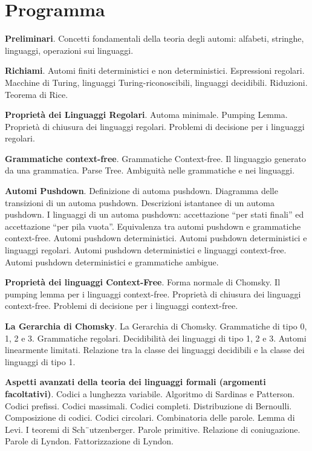 \setcounter{chapter}{-1}
\chapter{Programma}
\textbf{Preliminari}. Concetti fondamentali della teoria degli automi: alfabeti, stringhe, linguaggi,
operazioni sui linguaggi.

\vspace{3mm}

\textbf{Richiami}. Automi finiti deterministici e non deterministici. Espressioni regolari. Macchine
di Turing, linguaggi Turing-riconoscibili, linguaggi decidibili. Riduzioni. Teorema di Rice.

\vspace{3mm}


\textbf{Proprietà dei Linguaggi Regolari}. Automa minimale. Pumping Lemma. Proprietà di
chiusura dei linguaggi regolari. Problemi di decisione per i linguaggi regolari.

\vspace{3mm}


\textbf{Grammatiche context-free}. Grammatiche Context-free. Il linguaggio generato da una grammatica. Parse Tree. Ambiguità nelle grammatiche e nei linguaggi.

\vspace{3mm}


\textbf{Automi Pushdown}. Definizione di automa pushdown. Diagramma delle transizioni di un
automa pushdown. Descrizioni istantanee di un automa pushdown. I linguaggi di un automa
pushdown: accettazione “per stati finali” ed accettazione “per pila vuota”. Equivalenza tra
automi pushdown e grammatiche context-free. Automi pushdown deterministici. Automi
pushdown deterministici e linguaggi regolari. Automi pushdown deterministici e linguaggi
context-free. Automi pushdown deterministici e grammatiche ambigue.

\vspace{3mm}


\textbf{Proprietà dei linguaggi Context-Free}. Forma normale di Chomsky. Il pumping lemma per i
linguaggi context-free. Proprietà di chiusura dei linguaggi context-free. Problemi di decisione
per i linguaggi context-free.

\vspace{3mm}


\textbf{La Gerarchia di Chomsky}. La Gerarchia di Chomsky. Grammatiche di tipo 0, 1, 2 e 3.
Grammatiche regolari. Decidibilità dei linguaggi di tipo 1, 2 e 3. Automi linearmente
limitati. Relazione tra la classe dei linguaggi decidibili e la classe dei linguaggi di tipo 1.

\vspace{3mm}


\textbf{Aspetti avanzati della teoria dei linguaggi formali (argomenti facoltativi)}. Codici a lunghezza
variabile. Algoritmo di Sardinas e Patterson. Codici prefissi. Codici massimali. Codici
completi. Distribuzione di Bernoulli. Composizione di codici. Codici circolari. Combinatoria
delle parole. Lemma di Levi. I teoremi di Sch¨utzenberger. Parole primitive. Relazione di
coniugazione. Parole di Lyndon. Fattorizzazione di Lyndon.